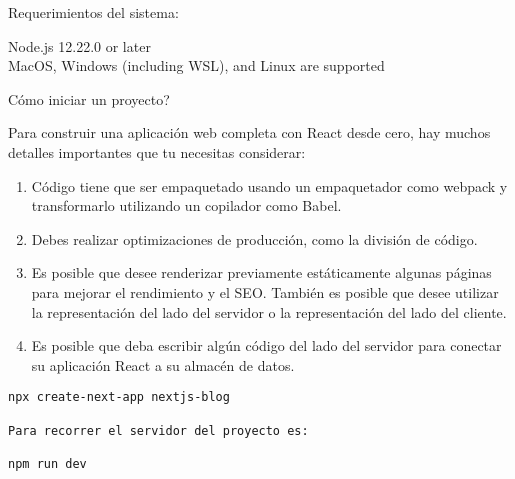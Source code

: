 Requerimientos del sistema: 

Node.js 12.22.0 or later\\
MacOS, Windows (including WSL), and Linux are supported


C\'omo iniciar un proyecto?

Para construir una aplicaci\'on web completa con React desde cero, hay muchos detalles importantes que tu necesitas considerar: 
\begin{enumerate}
	\item C\'odigo tiene que ser empaquetado usando un empaquetador como webpack y transformarlo utilizando un copilador como Babel.
	\item Debes realizar optimizaciones de producci\'on, como la divisi\'on de c\'odigo.
	\item Es posible que desee renderizar previamente est\'aticamente algunas p\'aginas para mejorar el rendimiento y el SEO. Tambi\'en es posible que desee utilizar la representaci\'on del lado del servidor o la representaci\'on del lado del cliente.
	
	
	\item Es posible que deba escribir alg\'un c\'odigo del lado del servidor para conectar su aplicaci\'on React a su almac\'en de datos.
\end{enumerate}
\begin{verbatim}
npx create-next-app nextjs-blog

Para recorrer el servidor del proyecto es:

npm run dev
\end{verbatim}





